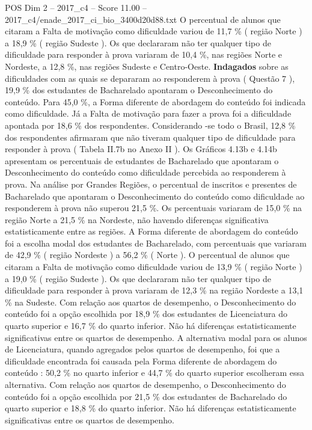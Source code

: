 \begin{textsample}{POS Dim 2 – 2017\_c4 – Score 11.00 – 2017\_c4/enade\_2017\_ci\_bio\_3400d20d88.txt}
O percentual de alunos que citaram a Falta de motivação como dificuldade variou de 11,7 \% ( região Norte ) a 18,9 \% ( região Sudeste ).
Os que declararam não ter qualquer tipo de dificuldade para responder à prova variaram de 10,4 \%, nas regiões Norte e Nordeste, a 12,8 \%, nas regiões Sudeste e Centro-Oeste. \textbf{Indagados} sobre as dificuldades com as quais se depararam ao responderem à prova ( Questão 7 ), 19,9 \% dos estudantes de Bacharelado apontaram o Desconhecimento do conteúdo.
Para 45,0 \%, a Forma diferente de abordagem do conteúdo foi indicada como dificuldade.
Já a Falta de motivação para fazer a prova foi a dificuldade apontada por 18,6 \% dos respondentes.
Considerando -se todo o Brasil, 12,8 \% dos respondentes afirmaram que não tiveram qualquer tipo de dificuldade para responder à prova ( Tabela II.7b no Anexo II ).
Os Gráficos 4.13b e 4.14b apresentam os percentuais de estudantes de Bacharelado que apontaram o Desconhecimento do conteúdo como dificuldade percebida ao responderem à prova.
Na análise por Grandes Regiões, o percentual de inscritos e presentes de Bacharelado que apontaram o Desconhecimento do conteúdo como dificuldade ao responderem à prova não superou 21,5 \%.
Os percentuais variaram de 15,0 \% na região Norte a 21,5 \% na Nordeste, não havendo diferenças significativa estatisticamente entre as regiões.
A Forma diferente de abordagem do conteúdo foi a escolha modal dos estudantes de Bacharelado, com percentuais que variaram de 42,9 \% ( região Nordeste ) a 56,2 \% ( Norte ).
O percentual de alunos que citaram a Falta de motivação como dificuldade variou de 13,9 \% ( região Norte ) a 19,0 \% ( região Sudeste ).
Os que declararam não ter qualquer tipo de dificuldade para responder à prova variaram de 12,3 \% na região Nordeste a 13,1 \% na Sudeste.
Com relação aos quartos de desempenho, o Desconhecimento do conteúdo foi a opção escolhida por 18,9 \% dos estudantes de Licenciatura do quarto superior e 16,7 \% do quarto inferior.
Não há diferenças estatisticamente significativas entre os quartos de desempenho.
A alternativa modal para os alunos de Licenciatura, quando agregados pelos quartos de desempenho, foi que a dificuldade encontrada foi causada pela Forma diferente de abordagem do conteúdo : 50,2 \% no quarto inferior e 44,7 \% do quarto superior escolheram essa alternativa.
Com relação aos quartos de desempenho, o Desconhecimento do conteúdo foi a opção escolhida por 21,5 \% dos estudantes de Bacharelado do quarto superior e 18,8 \% do quarto inferior.
Não há diferenças estatisticamente significativas entre os quartos de desempenho.

\end{textsample}
